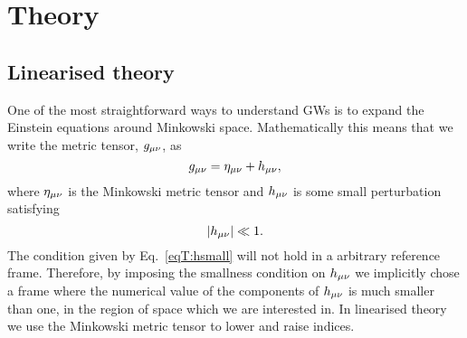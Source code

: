 

\chapter{Theory} \label{ch:theory}
\section{Linearised theory}
One of the most straightforward ways to understand 
GWs is to expand the Einstein equations around 
Minkowski space. Mathematically this means that we write the
metric tensor, $g_{\mu\nu}$, as
\begin{equation} \label{eqT:metric}
g_{\mu\nu} = \eta_{\mu\nu} + h_{\mu\nu},
\end{equation}
where $\eta_{\mu\nu}$ is the Minkowski metric tensor and $h_{\mu\nu}$
is some small perturbation satisfying
\begin{equation} \label{eqT:hsmall}
|h_{\mu\nu}|  \ll 1.
\end{equation}
The condition given by Eq.~\ref{eqT:hsmall} will not hold in a arbitrary 
reference frame. Therefore, by imposing the smallness condition on $h_{\mu\nu}$
we implicitly chose a frame where the numerical value of the components of $h_{\mu\nu}$ is much smaller than one,
in the region of space which we are interested in. In linearised theory we use the Minkowski metric tensor
to lower and raise indices. 

